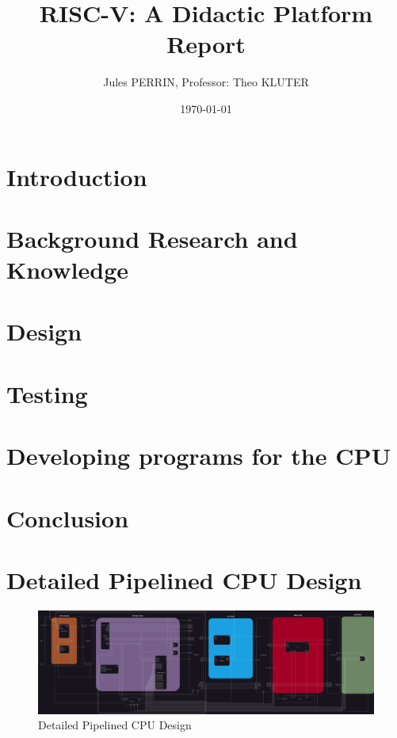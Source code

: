 \documentclass[12pt]{article}
\title{RISC-V: A Didactic Platform \\
Report}
\author{Jules PERRIN, Professor: Theo KLUTER}
\date{\today}
\begin{document}
\maketitle
\tableofcontents

\section{Introduction}




\section{Background Research and Knowledge}






\section{Design}




\section{Testing}



\section{Developing programs for the CPU}


\section{Conclusion}


\printbibliography[heading=bibintoc]

\appendix
\section{Detailed Pipelined CPU Design}
\label{appendix:pipelined_design}
\begin{figure}
    \centering
    \includegraphics[width=\textheight]{appendix/images/pipelined_design_detail.png} %
    \caption{Detailed Pipelined CPU Design}
\end{figure}
\end{document}
